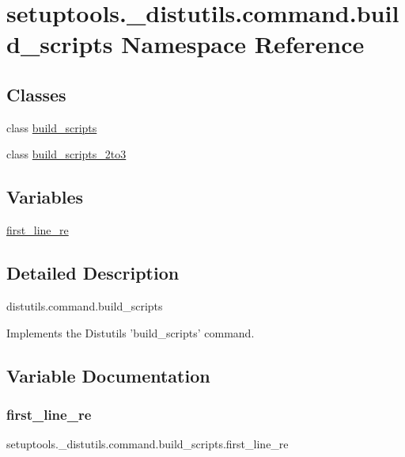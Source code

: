 \hypertarget{namespacesetuptools_1_1__distutils_1_1command_1_1build__scripts}{}\section{setuptools.\+\_\+distutils.\+command.\+build\+\_\+scripts Namespace Reference}
\label{namespacesetuptools_1_1__distutils_1_1command_1_1build__scripts}
\subsection*{Classes}
\begin{DoxyCompactItemize}
\item 
class \hyperlink{classsetuptools_1_1__distutils_1_1command_1_1build__scripts_1_1build__scripts}{build\+\_\+scripts}
\item 
class \hyperlink{classsetuptools_1_1__distutils_1_1command_1_1build__scripts_1_1build__scripts__2to3}{build\+\_\+scripts\+\_\+2to3}
\end{DoxyCompactItemize}
\subsection*{Variables}
\begin{DoxyCompactItemize}
\item 
\hyperlink{namespacesetuptools_1_1__distutils_1_1command_1_1build__scripts_ae3e0cb42111dcf251cb7b019c6fd5040}{first\+\_\+line\+\_\+re}
\end{DoxyCompactItemize}


\subsection{Detailed Description}
\begin{DoxyVerb}distutils.command.build_scripts

Implements the Distutils 'build_scripts' command.\end{DoxyVerb}
 

\subsection{Variable Documentation}
\mbox{\label{namespacesetuptools_1_1__distutils_1_1command_1_1build__scripts_ae3e0cb42111dcf251cb7b019c6fd5040}} 
\subsubsection{\texorpdfstring{first\+\_\+line\+\_\+re}{first\_line\_re}}
{\footnotesize\ttfamily setuptools.\+\_\+distutils.\+command.\+build\+\_\+scripts.\+first\+\_\+line\+\_\+re}

